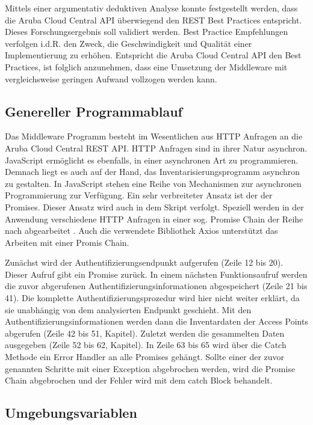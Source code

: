 Mittels einer argumentativ deduktiven Analyse konnte festgestellt werden, dass die Aruba Cloud Central API überwiegend den REST Best Practices entspricht. Dieses Forschungsergebnis soll validiert werden. Best Practice Empfehlungen verfolgen i.d.R. den Zweck, die Geschwindigkeit und Qualität einer Implementierung zu erhöhen. Entspricht die Aruba Cloud Central API den Best Practices, ist folglich anzunehmen, dass eine Umsetzung der Middleware mit vergleichsweise geringen Aufwand vollzogen werden kann.

\subsection{Genereller Programmablauf}\label{subsection:genereller-programmablauf}

Das Middleware Programm besteht im Wesentlichen aus HTTP Anfragen an die Aruba Cloud Central REST API. HTTP Anfragen sind in ihrer Natur asynchron. JavaScript ermöglicht es ebenfalls, in einer asynchronen Art zu programmieren. Demnach liegt es auch auf der Hand, das Inventarisierungsprogramm asynchron zu gestalten. In JavaScript stehen eine Reihe von Mechanismen zur asynchronen Programmierung zur Verfügung. Ein sehr verbreiteter Ansatz ist der der Promises. Dieser Ansatz wird auch in dem Skript verfolgt. Speziell werden in der Anwendung verschiedene HTTP Anfragen in einer sog. Promise Chain der Reihe nach abgearbeitet . Auch die verwendete Bibliothek Axios unterstützt das Arbeiten mit einer Promis Chain. 

Zunächst wird der Authentifizierungsendpunkt aufgerufen (Zeile 12 bis 20). Dieser Aufruf gibt ein Promise zurück. In einem nächsten Funktionsaufruf werden die zuvor abgerufenen Authentifizierungsinformationen abgespeichert (Zeile 21 bis 41). Die komplette Authentifizierungsprozedur wird hier nicht weiter erklärt, da sie unabhängig von dem analysierten Endpunkt geschieht. Mit den Authentifizierungsinformationen werden dann die Inventardaten der Access Points abgerufen (Zeile 42 bis 51, Kapitel). Zuletzt werden die gesammelten Daten ausgegeben (Zeile 52 bis 62, Kapitel). In Zeile 63 bis 65 wird über die Catch Methode ein Error Handler an alle Promises gehängt. Sollte einer der zuvor genannten Schritte mit einer Exception abgebrochen werden, wird die Promise Chain abgebrochen und der Fehler wird mit dem catch Block behandelt.

\subsection{Umgebungsvariablen}\label{subsection:Umgebungsvariablen}

